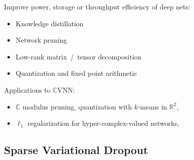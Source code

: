 \documentclass{beamer}
\newcommand{\real}{\mathbb{R}}
\newcommand{\cplx}{\mathbb{C}}
\begin{document}
\begin{frame}[c]{\insertsection}
  Improve power, storage or throughput efficiency of deep nets:
  \begin{itemize}
    \item Knowledge distillation
      \citep{hinton_distilling_2015,balasubramanian_deep_2016}
    \item Network pruning
      \citep{lecun_optimal_1990,seide_conversational_2011,zhu_prune_2018}
    \item Low-rank matrix~/~tensor decomposition
      \citep{denton_exploiting_2014,novikov_tensorizing_2015}
    \item Quantization and fixed point arithmetic
      \cite{courbariaux_training_2015,han_deep_2016,chen_fxpnet_2017}
  \end{itemize}

  \bigskip
  Applications to $\cplx$VNN:
  \begin{itemize}
    \item $\cplx$ modulus pruning, quantization with $k$-means in $
      \real^2%
    $, \citep{wu_compressing_2019}
    \item $\ell_1$ regularization for hyper-complex-valued networks, \citep{vecchi_compressing_2020}
  \end{itemize}

\end{frame}

\subsection{Sparse Variational Dropout \citep{molchanov_variational_2017}} %
\label{sub:sparse_variational_dropout}
\end{document}
